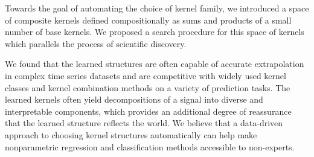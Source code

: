 \documentclass[twoside]{article}
\renewcommand{\TBD}[1]{}
\renewcommand{\fTBD}[1]{}
\begin{document}

%



Towards the goal of automating the choice of kernel family, we introduced a space of composite kernels defined compositionally as sums and products of a small number of base kernels.
We proposed a search procedure for this space of kernels which parallels the process of scientific discovery.

We found that the learned structures are often capable of accurate extrapolation in complex time series datasets and are competitive with widely used kernel classes and kernel combination methods on a variety of prediction tasks.
The learned kernels often yield decompositions of a signal into diverse and interpretable components, which provides an additional degree of reassurance that the learned structure reflects the world.
We believe that a data-driven approach to choosing kernel structures automatically can help make nonparametric regression and classification methods accessible to non-experts.
\end{document}
